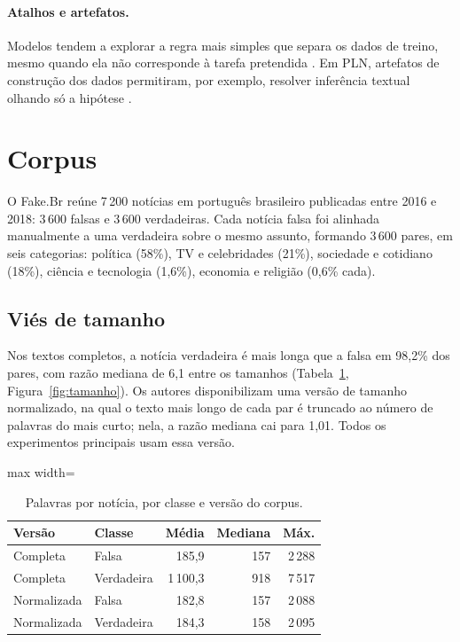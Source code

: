 \paragraph{Atalhos e artefatos.} Modelos tendem a explorar a regra mais simples que separa os dados de treino, mesmo quando ela não corresponde à tarefa pretendida \citep{geirhos2020}. Em PLN, artefatos de construção dos dados permitiram, por exemplo, resolver inferência textual olhando só a hipótese \citep{gururangan2018}.

\section{Corpus}

O Fake.Br \citep{monteiro2018} reúne 7\,200 notícias em português brasileiro publicadas entre 2016 e 2018: 3\,600 falsas e 3\,600 verdadeiras. Cada notícia falsa foi alinhada manualmente a uma verdadeira sobre o mesmo assunto, formando 3\,600 pares, em seis categorias: política (58\%), TV e celebridades (21\%), sociedade e cotidiano (18\%), ciência e tecnologia (1,6\%), economia e religião (0,6\% cada).

\subsection{Viés de tamanho}

Nos textos completos, a notícia verdadeira é mais longa que a falsa em 98,2\% dos pares, com razão mediana de 6,1 entre os tamanhos (Tabela~\ref{tab:tamanho}, Figura~\ref{fig:tamanho}). Os autores disponibilizam uma versão de tamanho normalizado, na qual o texto mais longo de cada par é truncado ao número de palavras do mais curto; nela, a razão mediana cai para 1,01. Todos os experimentos principais usam essa versão.

\begin{table}[t]
\centering\small
\begin{adjustbox}{max width=\columnwidth}
\begin{tabular}{llrrr}
\toprule
Versão & Classe & Média & Mediana & Máx. \\
\midrule
Completa & Falsa & 185,9 & 157 & 2\,288 \\
Completa & Verdadeira & 1\,100,3 & 918 & 7\,517 \\
Normalizada & Falsa & 182,8 & 157 & 2\,088 \\
Normalizada & Verdadeira & 184,3 & 158 & 2\,095 \\
\bottomrule
\end{tabular}
\end{adjustbox}
\caption{Palavras por notícia, por classe e versão do corpus.}
\label{tab:tamanho}
\end{table}

